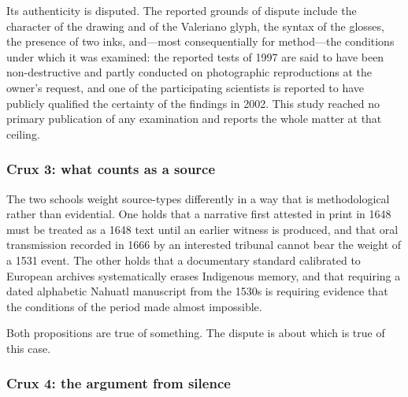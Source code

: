 Its authenticity is disputed. The reported grounds of dispute include
the character of the drawing and of the Valeriano glyph, the syntax
of the glosses, the presence of two inks, and---most consequentially
for method---the conditions under which it was examined: the reported
tests of 1997 are said to have been non-destructive and partly
conducted on photographic reproductions at the owner's request, and
one of the participating scientists is reported to have publicly
qualified the certainty of the findings in 2002. This study reached
no primary publication of any examination and reports the whole
matter at that
ceiling.

\subsubsection*{Crux 3: what counts as a source}

The two schools weight source-types differently in a way that is
methodological rather than evidential. One holds that a narrative
first attested in print in 1648 must be treated as a 1648 text until
an earlier witness is produced, and that oral transmission recorded
in 1666 by an interested tribunal cannot bear the weight of a
1531 event. The other holds that a documentary standard calibrated to
European archives systematically erases Indigenous memory, and that
requiring a dated alphabetic Nahuatl manuscript from the 1530s is
requiring evidence that the conditions of the period made almost
impossible.

Both propositions are true of something. The dispute is about which
is true of this case.

\subsubsection*{Crux 4: the argument from silence}

